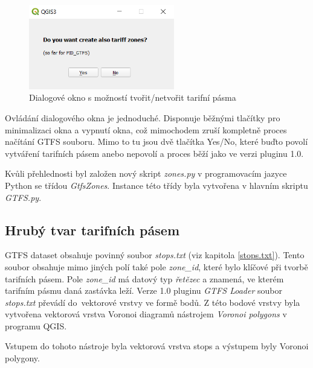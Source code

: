 \begin{figure}[H] \centering
    \includegraphics[width=180pt]{./pictures/dialog.png}
    \caption[Dialogové okno s možností tvořit/netvořit tarifní pásma]{Dialogové okno s možností tvořit/netvořit tarifní pásma}
	\label{fig:dialog}                                
\end{figure}

Ovládání dialogového okna je jednoduché. Disponuje běžnými tlačítky pro mi\-nimalizaci okna a vypnutí okna, což mimochodem
zruší kompletně proces načítání GTFS souboru. Mimo to tu jsou dvě tlačítka Yes/No, které buďto povolí vytváření tarifních
pásem anebo nepovolí a proces běží jako ve verzi pluginu 1.0.

Kvůli přehlednosti byl založen nový skript \textit{zones.py} v programovacím jazyce Python se třídou \textit{GtfsZones}. 
Instance této třídy byla vytvořena v hlavním skriptu \textit{GTFS.py}.

\subsection{Hrubý tvar tarifních pásem}
\label{hruby_tvar}

GTFS dataset obsahuje povinný  soubor \textit{stops.txt} (viz kapitola \ref{stops.txt}). Tento soubor obsahuje mimo
jiných polí také pole \textit{zone\_id}, které bylo klíčové při tvorbě tarifních pásem.
Pole \textit{zone\_id} má datový typ \textit{řetězec} a znamená, ve kterém ta\-rifním
pásmu daná zastávka leží. Verze 1.0 pluginu \textit{GTFS Loader} soubor \textit{stops.txt} převádí do~vektorové vrstvy
ve formě bodů. Z této bodové vrstvy byla vytvořena vektorová vrstva Voronoi 
diagramů nástrojem \textit{Voronoi polygons} v programu QGIS. 

Vstupem do tohoto nástroje byla vektorová vrstva stops a výstupem byly Voronoi polygony.

